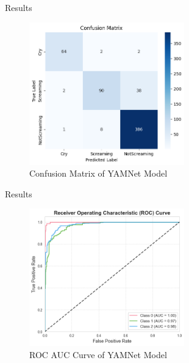 \documentclass{beamer}
\begin{document}
\begin{frame}{Results}
    
    \begin{figure}
        \centering
        \includegraphics[width=0.6\textwidth]{yamnet2.png}
        \caption{Confusion Matrix of YAMNet Model}
    \end{figure}

\end{frame}

\begin{frame}{Results}
    
    \begin{figure}
        \centering
        \includegraphics[width=0.6\textwidth]{yamnet3.png}
        \caption{ROC AUC Curve of YAMNet Model}
    \end{figure}

\end{frame}
\end{document}
